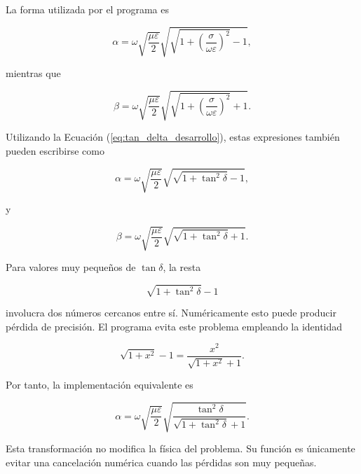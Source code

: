 La forma utilizada por el programa es

\begin{equation}
\alpha
=
\omega
\sqrt{\frac{\mu\varepsilon}{2}}
\sqrt{
\sqrt{
1+
\left(
\frac{\sigma}{\omega\varepsilon}
\right)^2
}
-1
},
\label{eq:alpha_exacta}
\end{equation}

mientras que

\begin{equation}
\beta
=
\omega
\sqrt{\frac{\mu\varepsilon}{2}}
\sqrt{
\sqrt{
1+
\left(
\frac{\sigma}{\omega\varepsilon}
\right)^2
}
+1
}.
\label{eq:beta_exacta}
\end{equation}

Utilizando la Ecuación (\ref{eq:tan_delta_desarrollo}), estas expresiones también pueden escribirse como

\begin{equation}
\alpha
=
\omega
\sqrt{\frac{\mu\varepsilon}{2}}
\sqrt{
\sqrt{1+\tan^2\delta}-1
},
\end{equation}

y

\begin{equation}
\beta
=
\omega
\sqrt{\frac{\mu\varepsilon}{2}}
\sqrt{
\sqrt{1+\tan^2\delta}+1
}.
\end{equation}

Para valores muy pequeños de $\tan\delta$, la resta

\begin{equation}
\sqrt{1+\tan^2\delta}-1
\end{equation}

involucra dos números cercanos entre sí. Numéricamente esto puede producir pérdida de precisión. El programa evita este problema empleando la identidad

\begin{equation}
\sqrt{1+x^2}-1
=
\frac{x^2}{\sqrt{1+x^2}+1}.
\end{equation}

Por tanto, la implementación equivalente es

\begin{equation}
\alpha
=
\omega
\sqrt{\frac{\mu\varepsilon}{2}}
\sqrt{
\frac{\tan^2\delta}
{\sqrt{1+\tan^2\delta}+1}
}.
\label{eq:alpha_estable}
\end{equation}

Esta transformación no modifica la física del problema. Su función es únicamente evitar una cancelación numérica cuando las pérdidas son muy pequeñas.

